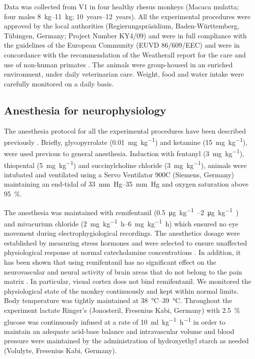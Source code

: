 
Data was collected from \ac{V1} in four healthy rhesus monkeys (Macaca mulatta; four males \SIrange{8}{11}{kg}; \SIrange{10}{12}{years}).
All the experimental procedures were approved by the local authorities (Regierungspr\"asidium, Baden-W\"urttemberg, T\"ubingen, Germany; Project Number KY4/09) and were in full compliance with the guidelines of the European Community (EUVD 86/609/EEC) and were in concordance with the recommendation of the Weatherall report for the care and use of non-human primates \citep{Weatherall2006}.
The animals were group-housed in an enriched environment, under daily veterinarian care.
Weight, food and water intake were carefully monitored on a daily basis.


\subsection{Anesthesia for neurophysiology}

The anesthesia protocol for all the experimental procedures have been described previously \citep{Logothetis1999,Logothetis2001}.
Briefly, glycopyrrolate (\SI{0.01}{mg.{kg}^{-1}}) and ketamine (\SI{15}{mg.{kg}^{-1}}), were used previous to general anesthesia.
Induction with fentanyl (\SI{3}{mg.{kg}^{-1}}), thiopental (\SI{5}{mg.{kg}^{-1}}) and succinylcholine chloride (\SI{3}{mg.{kg}^{-1}}), animals were intubated and ventilated using a Servo Ventilator 900C (Siemens, Germany) maintaining an end-tidal  of \SIrange{33}{35}{mm.Hg} and oxygen saturation above \SI{95}{\percent}.

The anesthesia was maintained with remifentanil (\SIrange{0.5}{2}{\micro\gram.kg^{-1}.\min}) and mivacurium chloride (\SIrange{2}{6}{mg.kg^{-1}.h}) which ensured no eye movement during electrophygiological recordings.
The anesthetics dosage were established by measuring stress hormones and were selected to ensure unaffected physiological response at normal catecholamine concentrations \citep{Logothetis1999}.
In addition, it has been shown that using remifentanil has no significant effect on the neurovascular and neural activity of brain areas that do not belong to the pain matrix \citep{Goense2008,Zappe2008}.
In particular, visual cortex does not bind remifentanil.
We monitored the physiological state of the monkey continuously and kept within normal limits.
Body temperature was tightly maintained at \SIrange{38}{39}{\celsius}.
Throughout the experiment lactate Ringer's (Jonosteril, Fresenius Kabi, Germany) with \SI{2.5}{\percent} glucose was continuously infused at a rate of \SI{10}{ml.kg^{-1}.h^{-1}} in order to maintain an adequate acid-base balance and intravascular volume and blood pressure were maintained by the administration of hydroxyethyl starch as needed (Volulyte, Fresenius Kabi, Germany).

